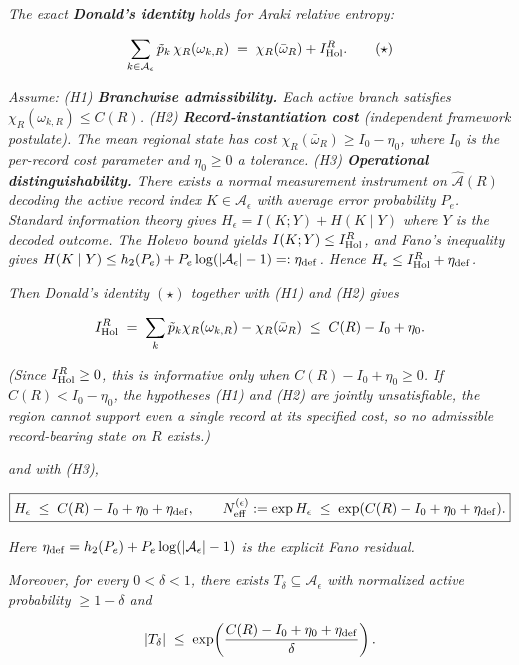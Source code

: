 \documentclass[11pt,a4paper]{article}
\begin{document}
\emph{The exact \textbf{Donald's identity} holds for Araki relative entropy:}

\[
\sum_{k \in \mathcal{A}_\epsilon} \tilde p_k \, \chi_R(\omega_{k,R}) \;=\; \chi_R(\bar\omega_R) + I_{\rm Hol}^R. \tag{$\star$}
\]

\emph{Assume:}
\emph{(H1) \textbf{Branchwise admissibility.} Each active branch satisfies $\chi_R(\omega_{k,R}) \le C(R)$.}
\emph{(H2) \textbf{Record-instantiation cost} (independent framework postulate). The mean regional state has cost $\chi_R(\bar\omega_R) \ge I_0 - \eta_0$, where $I_0$ is the per-record cost parameter and $\eta_0 \ge 0$ a tolerance.}
\emph{(H3) \textbf{Operational distinguishability.} There exists a normal measurement instrument on $\hat{\mathcal{A}}(R)$ decoding the active record index $K \in \mathcal{A}_\epsilon$ with average error probability $P_e$. Standard information theory gives $H_\epsilon = I(K;Y) + H(K \mid Y)$ where $Y$ is the decoded outcome. The Holevo bound yields $I(K;Y) \le I_{\rm Hol}^R$, and Fano's inequality gives $H(K \mid Y) \le h_2(P_e) + P_e \log(|\mathcal{A}_\epsilon| - 1) =: \eta_{\rm def}$. Hence $H_\epsilon \le I_{\rm Hol}^R + \eta_{\rm def}$.}

\emph{Then Donald's identity $(\star)$ together with (H1) and (H2) gives}

\[
I_{\rm Hol}^R \;=\; \sum_k \tilde p_k \chi_R(\omega_{k,R}) - \chi_R(\bar\omega_R) \;\le\; C(R) - I_0 + \eta_0.
\]

\emph{(Since $I_{\rm Hol}^R \ge 0$, this is informative only when $C(R) - I_0 + \eta_0 \ge 0$. If $C(R) < I_0 - \eta_0$, the hypotheses (H1) and (H2) are jointly unsatisfiable, the region cannot support even a single record at its specified cost, so no admissible record-bearing state on $R$ exists.)}

\emph{and with (H3),}

\[
\boxed{H_\epsilon \;\le\; C(R) - I_0 + \eta_0 + \eta_{\rm def}, \qquad N^{(\epsilon)}_{\rm eff} := \exp H_\epsilon \;\le\; \exp(C(R) - I_0 + \eta_0 + \eta_{\rm def}).}
\]

\emph{Here $\eta_{\rm def} = h_2(P_e) + P_e \log(|\mathcal{A}_\epsilon| - 1)$ is the explicit Fano residual.}

\emph{Moreover, for every $0 < \delta < 1$, there exists $T_\delta \subseteq \mathcal{A}_\epsilon$ with normalized active probability $\ge 1 - \delta$ and}

\[
|T_\delta| \;\le\; \exp\!\left(\frac{C(R) - I_0 + \eta_0 + \eta_{\rm def}}{\delta}\right).
\]
\end{document}
